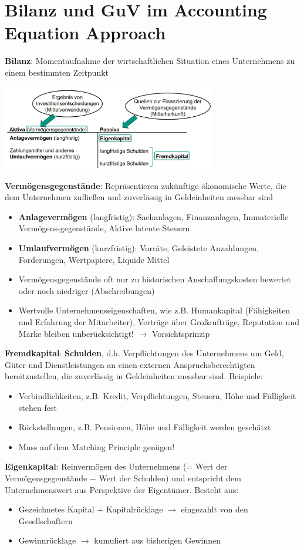 \section{Bilanz und GuV im Accounting Equation Approach}

\textbf{Bilanz}: Momentaufnahme der wirtschaftlichen Situation eines Unternehmens zu einem bestimmten
Zeitpunkt
\begin{center}
	\includegraphics[width=0.7\textwidth]{images/bilanz.png}
\end{center}

\textbf{Vermögensgegenstände}: Repräsentieren zukünftige ökonomische Werte, die dem Unternehmen zufließen und zuverlässig in Geldeinheiten messbar sind
\begin{itemize}
	\item \textbf{Anlagevermögen} (langfristig): Sachanlagen, Finanzanlagen, Immaterielle Vermögens-gegenstände, Aktive latente Steuern
	\item \textbf{Umlaufvermögen} (kurzfristig): Vorräte, Geleistete Anzahlungen, Forderungen, Wertpapiere, Liquide Mittel
	\item Vermögensgegenstände oft nur zu historischen Anschaffungskosten bewertet oder noch niedriger (Abschreibungen)
	\item Wertvolle Unternehmenseigenschaften, wie z.B. Humankapital (Fähigkeiten und Erfahrung der Mitarbeiter), Verträge über Großaufträge, Reputation und Marke bleiben unberücksichtigt!
	$\rightarrow$ Vorsichtsprinzip
\end{itemize}
\pagebreak
\textbf{Fremdkapital}: \textbf{Schulden}, d.h. Verpflichtungen des Unternehmens um Geld, Güter und Dienstleistungen an einen externen Anspruchsberechtigten bereitzustellen, die zuverlässig in Geldeinheiten messbar sind.
Beispiele:
\begin{itemize}
	\item Verbindlichkeiten, z.B. Kredit, Verpflichtungen, Steuern, Höhe und Fälligkeit stehen fest
	\item Rückstellungen, z.B. Pensionen, Höhe und Fälligkeit werden geschätzt
	\item Muss auf dem Matching Principle genügen!
\end{itemize}
\bigskip
\textbf{Eigenkapital}: Reinvermögen des Unternehmens (= Wert der Vermögensgegenstände $-$ Wert der Schulden) und entspricht dem Unternehmenswert aus Perspektive der Eigentümer.
Besteht aus:
\begin{itemize}
	\item Gezeichnetes Kapital $+$ Kapitalrücklage $\rightarrow$ eingezahlt von den Gesellschaftern
	\item Gewinnrücklage $\rightarrow$ kumuliert aus bisherigen Gewinnen
\end{itemize}
\bigskip

